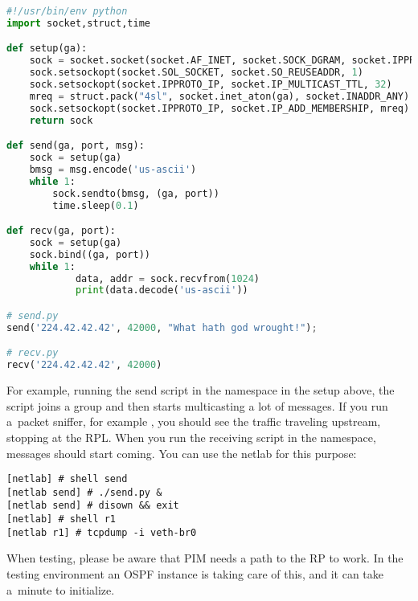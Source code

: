 \begin{lstlisting}[language=python]
#!/usr/bin/env python
import socket,struct,time

def setup(ga):
    sock = socket.socket(socket.AF_INET, socket.SOCK_DGRAM, socket.IPPROTO_UDP)
    sock.setsockopt(socket.SOL_SOCKET, socket.SO_REUSEADDR, 1)
    sock.setsockopt(socket.IPPROTO_IP, socket.IP_MULTICAST_TTL, 32)
    mreq = struct.pack("4sl", socket.inet_aton(ga), socket.INADDR_ANY)
    sock.setsockopt(socket.IPPROTO_IP, socket.IP_ADD_MEMBERSHIP, mreq)
    return sock

def send(ga, port, msg):
    sock = setup(ga)
    bmsg = msg.encode('us-ascii')
    while 1:
        sock.sendto(bmsg, (ga, port))
        time.sleep(0.1)

def recv(ga, port):
    sock = setup(ga)
    sock.bind((ga, port))
    while 1:
            data, addr = sock.recvfrom(1024)
            print(data.decode('us-ascii'))

# send.py
send('224.42.42.42', 42000, "What hath god wrought!");

# recv.py
recv('224.42.42.42', 42000)
\end{lstlisting}

\noindent For example, running the send script in the  namespace in the setup
above, the script joins a group and then starts multicasting a lot of messages.
If you run a~packet sniffer, for example , you should see the traffic
traveling upstream, stopping at the RPL. When you run the receiving script in
the  namespace, messages should start coming. You can use the netlab
for this purpose:

\begin{lstlisting}
[netlab] # shell send
[netlab send] # ./send.py &
[netlab send] # disown && exit
[netlab] # shell r1
[netlab r1] # tcpdump -i veth-br0
\end{lstlisting}

\noindent When testing, please be aware that PIM needs a path to the RP to work. In the
testing environment an OSPF instance is taking care of this, and it can take
a~minute to initialize.
